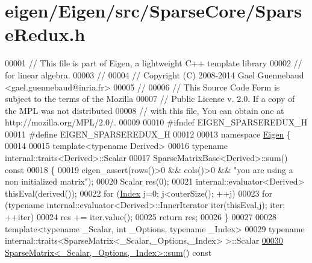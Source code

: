 \hypertarget{eigen_2_eigen_2src_2_sparse_core_2_sparse_redux_8h_source}{}\section{eigen/\+Eigen/src/\+Sparse\+Core/\+Sparse\+Redux.h}
\label{eigen_2_eigen_2src_2_sparse_core_2_sparse_redux_8h_source}

\begin{DoxyCode}
00001 \textcolor{comment}{// This file is part of Eigen, a lightweight C++ template library}
00002 \textcolor{comment}{// for linear algebra.}
00003 \textcolor{comment}{//}
00004 \textcolor{comment}{// Copyright (C) 2008-2014 Gael Guennebaud <gael.guennebaud@inria.fr>}
00005 \textcolor{comment}{//}
00006 \textcolor{comment}{// This Source Code Form is subject to the terms of the Mozilla}
00007 \textcolor{comment}{// Public License v. 2.0. If a copy of the MPL was not distributed}
00008 \textcolor{comment}{// with this file, You can obtain one at http://mozilla.org/MPL/2.0/.}
00009 
00010 \textcolor{preprocessor}{#ifndef EIGEN\_SPARSEREDUX\_H}
00011 \textcolor{preprocessor}{#define EIGEN\_SPARSEREDUX\_H}
00012 
00013 \textcolor{keyword}{namespace }\hyperlink{namespace_eigen}{Eigen} \{ 
00014 
00015 \textcolor{keyword}{template}<\textcolor{keyword}{typename} Derived>
00016 \textcolor{keyword}{typename} internal::traits<Derived>::Scalar
00017 SparseMatrixBase<Derived>::sum()\textcolor{keyword}{ const}
00018 \textcolor{keyword}{}\{
00019   eigen\_assert(rows()>0 && cols()>0 && \textcolor{stringliteral}{"you are using a non initialized matrix"});
00020   Scalar res(0);
00021   internal::evaluator<Derived> thisEval(derived());
00022   \textcolor{keywordflow}{for} (\hyperlink{namespace_eigen_a62e77e0933482dafde8fe197d9a2cfde}{Index} j=0; j<outerSize(); ++j)
00023     \textcolor{keywordflow}{for} (\textcolor{keyword}{typename} internal::evaluator<Derived>::InnerIterator iter(thisEval,j); iter; ++iter)
00024       res += iter.value();
00025   \textcolor{keywordflow}{return} res;
00026 \}
00027 
00028 \textcolor{keyword}{template}<\textcolor{keyword}{typename} \_Scalar, \textcolor{keywordtype}{int} \_Options, \textcolor{keyword}{typename} \_Index>
00029 \textcolor{keyword}{typename} internal::traits<SparseMatrix<\_Scalar,\_Options,\_Index> >::Scalar
\hyperlink{group___sparse_core___module_a0700cd0b8658962d742fa51a5e594a2f}{00030} \hyperlink{group___sparse_core___module_a0700cd0b8658962d742fa51a5e594a2f}{SparseMatrix<\_Scalar,\_Options,\_Index>::sum}()\textcolor{keyword}{ const}

\end{DoxyCode}
